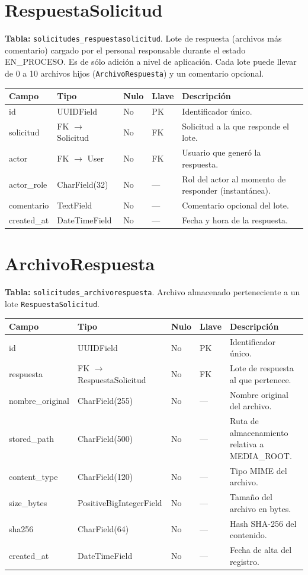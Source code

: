 \documentclass[12pt,letterpaper]{report}
\begin{document}
\section{RespuestaSolicitud}

\textbf{Tabla:} \texttt{solicitudes\_respuestasolicitud}. Lote de respuesta
(archivos más comentario) cargado por el personal responsable durante el estado
EN\_PROCESO. Es de sólo adición a nivel de aplicación. Cada lote puede llevar de
0 a 10 archivos hijos (\texttt{ArchivoRespuesta}) y un comentario opcional.

\begin{longtable}{L{2.9cm} L{2.6cm} C{1.0cm} C{1.0cm} L{6.6cm}}
\toprule
\textbf{Campo} & \textbf{Tipo} & \textbf{Nulo} & \textbf{Llave} & \textbf{Descripción} \\
\midrule
\endhead
id & UUIDField & No & PK & Identificador único. \\
solicitud & FK $\rightarrow$ Solicitud & No & FK & Solicitud a la que responde el lote. \\
actor & FK $\rightarrow$ User & No & FK & Usuario que generó la respuesta. \\
actor\_role & CharField(32) & No & --- & Rol del actor al momento de responder (instantánea). \\
comentario & TextField & No & --- & Comentario opcional del lote. \\
created\_at & DateTimeField & No & --- & Fecha y hora de la respuesta. \\
\bottomrule
\end{longtable}

\section{ArchivoRespuesta}

\textbf{Tabla:} \texttt{solicitudes\_archivorespuesta}. Archivo almacenado
perteneciente a un lote \texttt{RespuestaSolicitud}.

\begin{longtable}{L{2.9cm} L{2.6cm} C{1.0cm} C{1.0cm} L{6.6cm}}
\toprule
\textbf{Campo} & \textbf{Tipo} & \textbf{Nulo} & \textbf{Llave} & \textbf{Descripción} \\
\midrule
\endhead
id & UUIDField & No & PK & Identificador único. \\
respuesta & FK $\rightarrow$ RespuestaSolicitud & No & FK & Lote de respuesta al que pertenece. \\
nombre\_original & CharField(255) & No & --- & Nombre original del archivo. \\
stored\_path & CharField(500) & No & --- & Ruta de almacenamiento relativa a MEDIA\_ROOT. \\
content\_type & CharField(120) & No & --- & Tipo MIME del archivo. \\
size\_bytes & PositiveBigIntegerField & No & --- & Tamaño del archivo en bytes. \\
sha256 & CharField(64) & No & --- & Hash SHA-256 del contenido. \\
created\_at & DateTimeField & No & --- & Fecha de alta del registro. \\
\bottomrule
\end{longtable}
\end{document}
